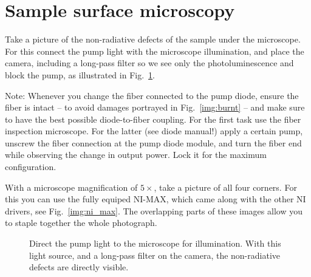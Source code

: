 \section{Sample surface microscopy}
\label{sec:microscopy}

Take a picture of the non-radiative defects
of the sample
under the microscope.
For this connect the pump light
with the microscope illumination,
and place the camera,
including a long-pass filter
so we see only the photoluminescence
and block the pump,
as illustrated in Fig.~\ref{img:microscopy}.

Note:
Whenever you change the fiber
connected to the pump diode,
ensure the fiber is intact --
to avoid damages portrayed in Fig.~\ref{img:burnt} --
and make sure
to have the best possible
diode-to-fiber coupling.
For the first task
use the fiber inspection microscope.
For the latter
(see diode manual!)
apply a certain pump,
unscrew the fiber connection
at the pump diode module,
and turn the fiber end
while observing the change in output power.
Lock it for the maximum configuration.

With a microscope magnification of $5\times$,
take a picture of all four corners.
For this you can use
the fully equiped NI-MAX,
which came along with the other NI drivers,
see Fig.~\ref{img:ni_max}.
The overlapping parts of these images
allow you to staple together
the whole photograph.

\begin{figure}
\centering
{}
\caption{Direct the pump light to the microscope for illumination.
With this light source,
and a long-pass filter on the camera,
the non-radiative defects are directly visible.}
\label{img:microscopy}
\end{figure}

